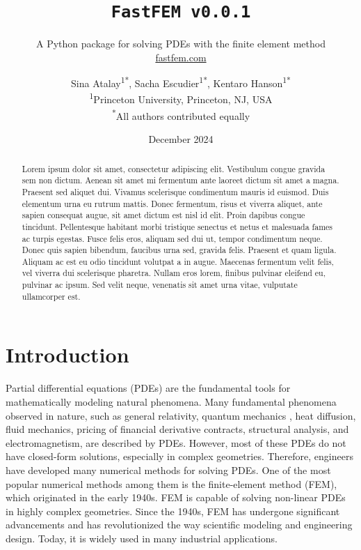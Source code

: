 \documentclass[headings=standardclasses, abstract=true]{scrartcl}
\title{\texttt{FastFEM v0.0.1}}
\subtitle{
    A Python package for solving PDEs with the finite element method    \\
    \vspace{0.2cm}
    \href{https://fastfem.com}{fastfem.com}
}
\author{
    Sina Atalay\textsuperscript{1*}, Sacha Escudier\textsuperscript{1*}, Kentaro Hanson\textsuperscript{1*} \\
    {\footnotesize \textsuperscript{1}Princeton University, Princeton, NJ, USA}\\
    {\footnotesize \textsuperscript{*}All authors contributed equally}
}
\date{
    \normalsize December 2024
}
\begin{document}
\maketitle

\begin{abstract}
\noindent Lorem ipsum dolor sit amet, consectetur adipiscing elit. Vestibulum congue gravida sem non dictum. Aenean sit amet mi fermentum ante laoreet dictum sit amet a magna. Praesent sed aliquet dui. Vivamus scelerisque condimentum mauris id euismod. Duis elementum urna eu rutrum mattis. Donec fermentum, risus et viverra aliquet, ante sapien consequat augue, sit amet dictum est nisl id elit. Proin dapibus congue tincidunt. Pellentesque habitant morbi tristique senectus et netus et malesuada fames ac turpis egestas. Fusce felis eros, aliquam sed dui ut, tempor condimentum neque. Donec quis sapien bibendum, faucibus urna sed, gravida felis. Praesent et quam ligula. Aliquam ac est eu odio tincidunt volutpat a in augue. Maecenas fermentum velit felis, vel viverra dui scelerisque pharetra. Nullam eros lorem, finibus pulvinar eleifend eu, pulvinar ac ipsum. Sed velit neque, venenatis sit amet urna vitae, vulputate ullamcorper est.
\end{abstract}

\section{Introduction}

Partial differential equations (PDEs) are the fundamental tools for mathematically modeling natural phenomena. Many fundamental phenomena observed in nature, such as general relativity\supercite{Marolf2001}, quantum mechanics \supercite{Feit1982}, heat diffusion\supercite{Bergman2011}, fluid mechanics\supercite{Lukaszewicz2016}, pricing of financial derivative contracts\supercite{Barles1998}, structural analysis\supercite{Boresi2002}, and electromagnetism\supercite{Griffiths2017}, are described by PDEs. However, most of these PDEs do not have closed-form solutions, especially in complex geometries. Therefore, engineers have developed many numerical methods for solving PDEs. One of the most popular numerical methods among them is the finite-element method (FEM), which originated in the early 1940s\supercite{Liu2022}. FEM is capable of solving non-linear PDEs in highly complex geometries. Since the 1940s, FEM has undergone significant advancements and has revolutionized the way scientific modeling and engineering design. Today, it is widely used in many industrial applications.
\end{document}
